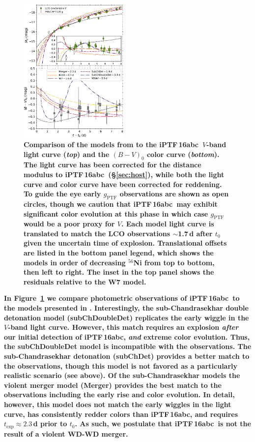 \documentclass[twocolumn]{aastex61}
\newcommand{\abc}{iPTF\,16abc}
\begin{document}
\begin{figure}[]
  \centering
  \includegraphics[width=0.48\textwidth]{compare_Noebauer.pdf}
  \caption{
%
  \textbf{Comparison of the models from \citet{2017MNRAS.472.2787N} to the
  \abc\ $V$-band light curve (\textit{top}) and the $(B-V)_0$ color curve
  (\textit{bottom}). The light curve has been corrected for the distance
  modulus to \abc\ (\S\ref{sec:host}), while both the light curve and color
  curve have been corrected for reddening. To guide the eye early
  $g_\mathrm{PTF}$ observations are shown as open circles, though we caution
  that \abc\ may exhibit significant color evolution at this phase in which
  case $g_\mathrm{PTF}$ would be a poor proxy for $V$. Each model light curve
  is translated to match the LCO observations $\sim$1.7\,d after $t_0$ given
  the uncertain time of explosion. Translational offsets are listed in the
  bottom panel legend, which shows the models in order of decreasing
  $^{56}$Ni from top to bottom, then left to right. The inset in
  the top panel shows the residuals relative to the W7 model.} }
  \label{fig:noebauer} 
\end{figure}

\textbf{In Figure~\ref{fig:noebauer} we compare photometric observations of
\abc\ to the models presented in \citet{2017MNRAS.472.2787N}. Interestingly,
the sub-Chandrasekhar double detonation model (subChDoubleDet) replicates the
early wiggle in the $V$-band light curve. However, this match requires an
explosion \textit{after} our initial detection of \abc, \textit{and} extreme
color evolution. Thus, the subChDoubleDet model is incompatible with the
observations. The sub-Chandrasekhar detonation (subChDet) provides a better
match to the observations, though this model is not favored as a particularly
realistic scenario (see above). Of the sub-Chandrasekhar models the violent
merger model (Merger) provides the best match to the observations including
the early rise and color evolution. In detail, however, this model does not
match the early wiggles in the light curve, has consistently redder colors
than \abc, and requires $t_\mathrm{exp} \approx 2.3$\,d prior to $t_0$. As
such, we postulate that \abc\ is not the result of a violent WD-WD merger.}
\end{document}
